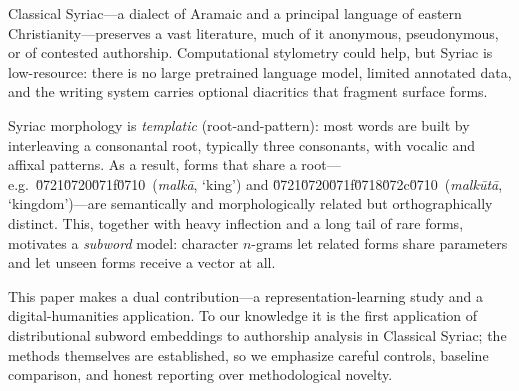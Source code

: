 \documentclass[11pt]{article}
\providecommand{\syriacfont}{}            %
\providecommand{\RL}[1]{#1}               %
\newcommand{\syrscript}[1]{{\syriacfont\RL{#1}}}
\newcommand{\syr}[3]{\syrscript{#1}~(\textit{#2}, `#3')}
\begin{document}
Classical Syriac---a dialect of Aramaic and a principal language of eastern
Christianity---preserves a vast literature, much of it anonymous, pseudonymous,
or of contested authorship. Computational stylometry could help, but Syriac is
low-resource: there is no large pretrained language model, limited annotated
data, and the writing system carries optional diacritics that fragment surface
forms.

Syriac morphology is \emph{templatic} (root-and-pattern): most words are built by
interleaving a consonantal root, typically three consonants, with vocalic and
affixal patterns. As a result, forms that share a root---e.g.\
\syr{\u0721\u0720\u071f\u0710}{malk\=a}{king} and
\syr{\u0721\u0720\u071f\u0718\u072c\u0710}{malk\=ut\=a}{kingdom}---are
semantically and morphologically related but orthographically distinct. This,
together with heavy inflection and a long tail of rare forms, motivates a
\emph{subword} model: character $n$-grams let related forms share parameters and
let unseen forms receive a vector at all.

This paper makes a dual contribution---a representation-learning study and a
digital-humanities application. To our knowledge it is the first application of
distributional subword embeddings to authorship analysis in Classical Syriac;
the methods themselves are established, so we emphasize careful controls,
baseline comparison, and honest reporting over methodological novelty.
\end{document}
